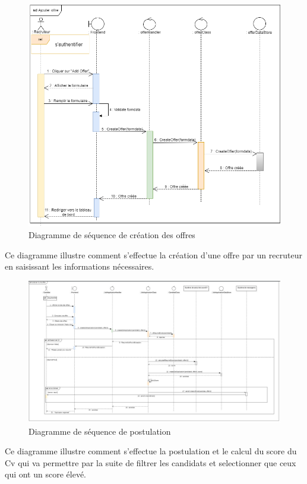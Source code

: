 \begin{figure}[H]
   \centering
   \includegraphics[scale=0.5]{diag/2.png} %
   \caption{Diagramme de séquence de création des offres}
   \label{fig:seq2}
\end{figure}
Ce diagramme illustre comment s'effectue la création d'une offre par un recruteur en saisissant les informations nécessaires.

\begin{figure}[htbp]
   \centering
   \includegraphics[scale=0.6]{diag/sd3.jpg} %
   \caption{Diagramme de séquence de postulation}
   \label{fig:seq3}
\end{figure}
   Ce diagramme illustre comment s'effectue la postulation et le calcul du score du Cv qui va permettre par la suite de filtrer les candidats et selectionner que ceux qui ont un score élevé.


